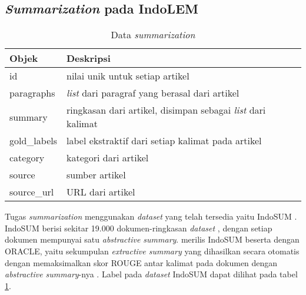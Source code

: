 \subsection{\textit{Summarization} pada IndoLEM}

\begin{table}[h]
    \caption{Data \textit{summarization}}
    \label{table:label-summarization}
    \begin{center}
        \begin{tabular}{l|l}
            \toprule
            \textbf{Objek} & \textbf{Deskripsi} \\
            \midrule
            id & nilai unik untuk setiap artikel \\
            paragraphs & \textit{list} dari paragraf yang berasal dari artikel \\
            summary & ringkasan dari artikel, disimpan sebagai \textit{list} dari kalimat \\ 
            gold\_labels & label ekstraktif dari setiap kalimat pada artikel \\
            category & kategori dari artikel \\
            source & sumber artikel \\
            source\_url & URL dari artikel \\
            \bottomrule
        \end{tabular}
    \end{center}
\end{table}

Tugas \textit{summarization} menggunakan \textit{dataset} yang telah tersedia yaitu IndoSUM \parencite{summarization}. IndoSUM berisi sekitar 19.000 dokumen-ringkasan \textit{dataset} \parencite{indolem}, dengan setiap dokumen mempunyai satu \textit{abstractive summary}. \citeauthor{summarization} merilis IndoSUM beserta dengan ORACLE, yaitu sekumpulan \textit{extractive summary} yang dihasilkan secara otomatis dengan memaksimalkan skor ROUGE antar kalimat pada dokumen dengan \textit{abstractive summary}-nya \parencite{indolem}. Label pada \textit{dataset} IndoSUM dapat dilihat pada tabel \ref{table:label-summarization}.

